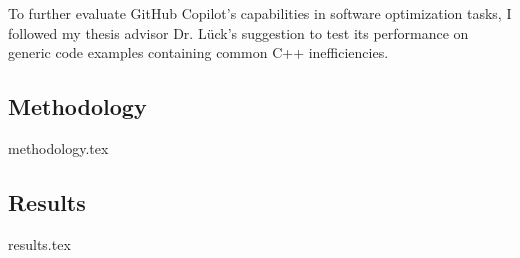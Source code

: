 To further evaluate GitHub Copilot's capabilities in software optimization tasks, I followed my thesis advisor Dr. Lück's suggestion to test its performance on generic code examples containing common C++ inefficiencies.

\subsection{Methodology}
{methodology.tex}

\subsection{Results}
{results.tex}